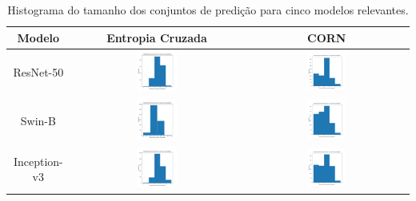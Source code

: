 \begin{table}[!htbp]
    \centering
    \caption{Histograma do tamanho dos conjuntos de predição para cinco modelos relevantes.}
    \label{tab:cp_set_sizes}
    \begin{tabular}{|c|c|c|}
        \hline
        \textbf{Modelo} & \textbf{Entropia Cruzada} & \textbf{CORN} \\ \hline
        ResNet-50 & \includegraphics[width=0.25\textwidth]{figs/conformal_prediction/resnet50_cp_cross_entropy.png} & \includegraphics[width=0.25\textwidth]{figs/conformal_prediction/resnet50_cp_corn.png} \\ \hline
        Swin-B & \includegraphics[width=0.25\textwidth]{figs/conformal_prediction/swin_b_cp_cross_entropy.png} & \includegraphics[width=0.25\textwidth]{figs/conformal_prediction/swin_b_cp_corn.png} \\ \hline
        Inception-v3 & \includegraphics[width=0.25\textwidth]{figs/conformal_prediction/inception_v3_cp_cross_entropy.png} & \includegraphics[width=0.25\textwidth]{figs/conformal_prediction/inception_v3_cp_corn.png} \\ \hline

\end{tabular}
\end{table}
